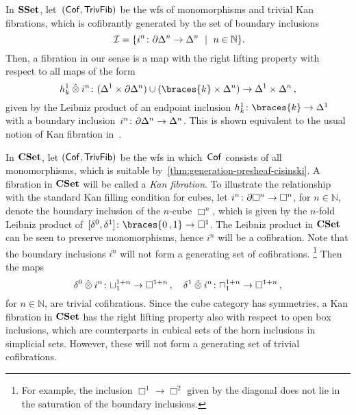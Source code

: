 \documentclass[reqno,10pt,a4paper,oneside,draft]{amsart}
\begin{document}
\begin{example} \label{thm:fib-is-kan}
In $\mathbf{SSet}$, let~$(\mathsf{Cof}, \mathsf{TrivFib})$ be the wfs of monomorphisms and trivial Kan fibrations, which is cofibrantly generated by the set of boundary inclusions 
\[
\cal{I} = \{ i^n \co \partial \Delta^n \to \Delta^n \ \mid \ n \in \mathbb{N} \} \rlap{.}
\]
Then, a fibration in our sense is a map with the right lifting property with respect to all maps of the form
\[
h_k^1 \hatotimes i^n \co (\Delta^1 \times \partial \Delta^n ) \cup (\braces{k} \times \Delta^n ) \to \Delta^1 \times \Delta^n 
\, ,\]
given by the Leibniz product of an endpoint inclusion $h_k^1 \co \braces{k} \to \Delta^1$ with a 
boundary inclusion~$i^n \colon \partial \Delta^n \to \Delta^n$.
This is shown equivalent to the usual notion of Kan fibration in~\cite[Chap.~IV, Sec.~2]{gabriel-zisman:calculus-of-fractions}.
\end{example}

\begin{example} \label{nonalgebraic-cof}
In $\mathbf{CSet}$, let $(\mathsf{Cof}, \mathsf{TrivFib})$ be the wfs in which~$\mathsf{Cof}$ consists of all monomorphisms, which is suitable by~\cref{thm:generation-presheaf-cisinski}.
A fibration in $\mathbf{CSet}$ will be called a \emph{Kan fibration}.
To illustrate the relationship with the standard Kan filling condition for cubes, let $i^n \colon \partial \Box^n \to \Box^n$, for $n \in \mathbb{N}$, denote the boundary inclusion of the $n$-cube $\Box^n$, which is given by the $n$-fold Leibniz product of~$[\lcyl, \rcyl] \co \braces{0\,, 1} \to \Box^1$.
The Leibniz product in $\mathbf{CSet}$ can be seen to preserve monomorphisms, hence $i^n$ will be a cofibration.
Note that the boundary inclusions $i^n$ will not form a generating set of cofibrations.%
\footnote{
For example, the inclusion $\Box^1 \to \Box^2$ given by the diagonal does not lie in the saturation of the boundary inclusions.}
Then the maps
\[
\delta^0 \mathbin{\hat{\otimes}} i^n \colon \sqcup_1^{1+n} \to \Box^{1+n} \, , \quad  \delta^1 \mathbin{\hat{\otimes}} i^n \colon \sqcap_1^{1+n} \to \Box^{1+n} \, ,
\]
for $n \in \mathbb{N}$, are trivial cofibrations.
Since the cube category has symmetries, a Kan fibration in $\mathbf{CSet}$ has the right lifting property also with respect to open box inclusions, which are counterparts in cubical sets of the horn inclusions in simplicial sets.
However, these will not form a generating set of trivial cofibrations.
%
\end{example}
\end{document}
